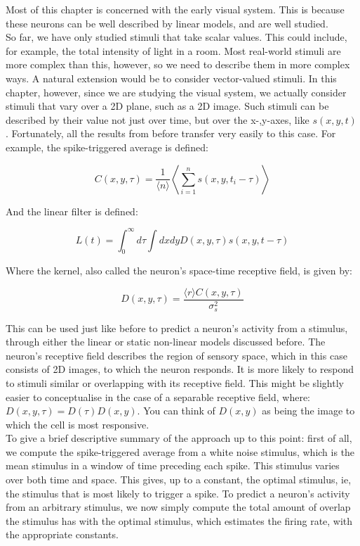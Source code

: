 \documentclass{article}
\begin{document}
Most of this chapter is concerned with the early visual system. This is because these neurons can be well described by linear models, and are well studied.\\

So far, we have only studied stimuli that take scalar values. This could include, for example, the total intensity of light in a room. Most real-world stimuli are more complex than this, however, so we need to describe them in more complex ways. A natural extension would be to consider vector-valued stimuli. In this chapter, however, since we are studying the visual system, we actually consider stimuli that vary over a 2D plane, such as a 2D image. Such stimuli can be described by their value not just over time, but over the x-,y-axes, like $s(x,y,t)$. Fortunately, all the results from before transfer very easily to this case. For example, the spike-triggered average is defined:

\begin{equation*}
    C(x,y,\tau) = \frac{1}{\langle n \rangle} \left \langle \sum_{i=1}^n s(x,y,t_i-\tau) \right \rangle
\end{equation*}

And the linear filter is defined:

\begin{equation*}
    L(t) = \int_0^\infty d\tau\int dx dy D(x,y,\tau)s(x,y,t-\tau)
\end{equation*}

Where the kernel, also called the neuron's space-time receptive field, is given by:

\begin{equation*}
    D(x,y,\tau) = \frac{\langle r \rangle C(x,y,\tau)}{\sigma_s^2}
\end{equation*}

This can be used just like before to predict a neuron's activity from a stimulus, through either the linear or static non-linear models discussed before. The neuron's receptive field describes the region of sensory space, which in this case consists of 2D images, to which the neuron responds. It is more likely to respond to stimuli similar or overlapping with its receptive field. This might be slightly easier to conceptualise in the case of a separable receptive field, where: $D(x,y,\tau)=D(\tau)D(x,y)$. You can think of $D(x,y)$ as being the image to which the cell is most responsive.\\

To give a brief descriptive summary of the approach up to this point: first of all, we compute the spike-triggered average from a white noise stimulus, which is the mean stimulus in a window of time preceding each spike. This stimulus varies over both time and space. This gives, up to a constant, the optimal stimulus, ie, the stimulus that is most likely to trigger a spike. To predict a neuron's activity from an arbitrary stimulus, we now simply compute the total amount of overlap the stimulus has with the optimal stimulus, which estimates the firing rate, with the appropriate constants.\\
\end{document}
